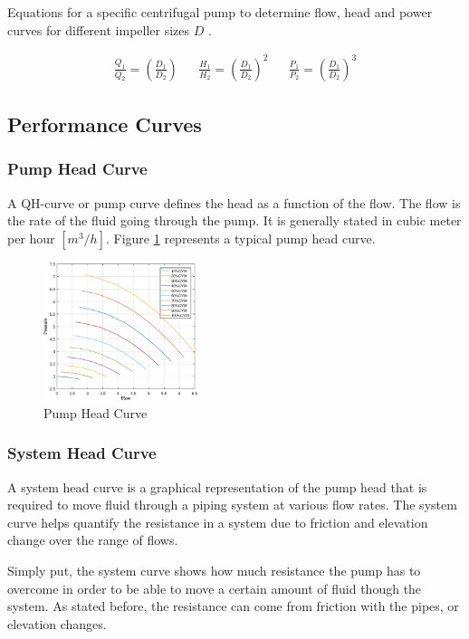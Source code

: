 Equations for a specific centrifugal pump to determine flow, head and power curves for different impeller sizes $D$ \cite{Volk2014}.

\begin{align*}
	\frac{Q_1}{Q_2} = \left(\frac{D_1}{D_2}\right)   &&
	\frac{H_1}{H_2} = \left(\frac{D_1}{D_2}\right)^2 &&
	\frac{P_1}{P_2} = \left(\frac{D_1}{D_2}\right)^3
\end{align*} 

\newpage

\subsection{Performance Curves}
\subsubsection{Pump Head Curve}
A QH-curve or pump curve defines the head as a function of the flow. The flow is the rate of the fluid going through the 
pump. It is generally stated in cubic meter per hour $[m^{3}/h]$. Figure \ref{fig:pump_head_curve} represents a typical pump head curve.


\begin{figure}[h]
	\centering
	\includegraphics[width=0.4\textwidth]{figures/05mathematicalModeling/pumpCurves.eps}
	\caption{Pump Head Curve}
	\label{fig:pump_head_curve}
\end{figure}


\subsubsection{System Head Curve}
A system head curve is a graphical representation of the pump head that is required to move fluid through a piping system at various flow rates.
The system curve helps quantify the resistance in a system due to friction and elevation change over the range of flows.

Simply put, the system curve shows how much resistance the pump has to overcome in order to be able to move a certain amount of fluid though the system.
As stated before, the resistance can come from friction with the pipes, or elevation changes.


